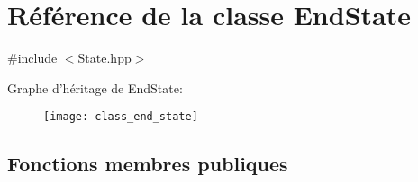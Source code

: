 \hypertarget{class_end_state}{\section{Référence de la classe End\-State}
\label{class_end_state}
}


{\ttfamily \#include $<$State.\-hpp$>$}

Graphe d'héritage de End\-State\-:\begin{figure}[H]
\begin{center}
\leavevmode
\texttt{[image: class\_end\_state]}
\end{center}
\end{figure}
\subsection*{Fonctions membres publiques}
